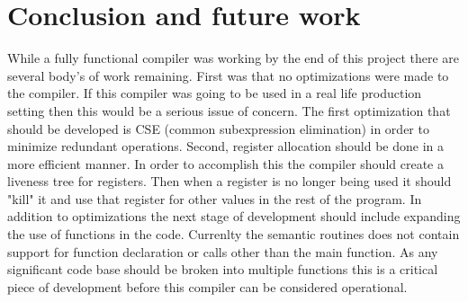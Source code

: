 \documentclass[12pt]{article}
\begin{document}
    \section{Conclusion and future work}	
			While a fully functional compiler was working by the end of this project there are several body's of work remaining.  First was that no optimizations were made to the compiler.  If this compiler was going to be used in a real life production setting then this would be a serious issue of concern.  The first optimization that should be developed is CSE (common subexpression elimination) in order to minimize redundant operations.  Second, register allocation should be done in a more efficient manner.  In order to accomplish this the compiler should create a liveness tree for registers.  Then when a register is no longer being used it should "kill" it and use that register for other values in the rest of the program.  
			In addition to optimizations the next stage of development should include expanding the use of functions in the code.  Currenlty the semantic routines does not contain support for function declaration or calls other than the main function.  As any significant code base should be broken into multiple functions this is a critical piece of development before this compiler can be considered operational.
    
 
\end{document}

